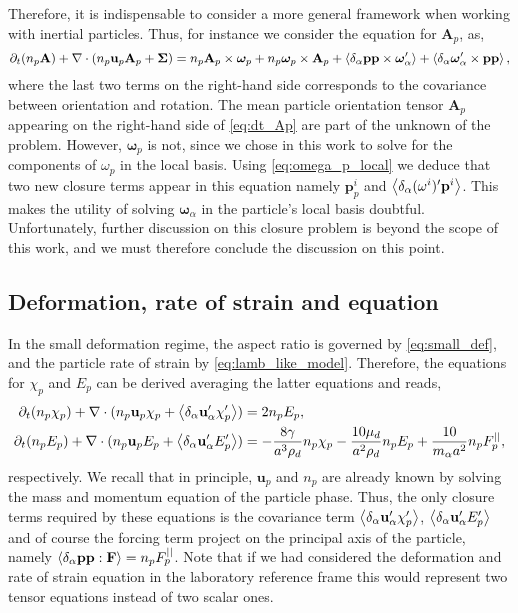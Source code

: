 Therefore, it is indispensable to consider a more general framework when working with inertial particles. 
Thus, for instance we consider the equation for $\textbf{A}_p$, as, 
\begin{equation*}
    \partial_t (n_p\textbf{A})
    + \mathbf{\nabla}\cdot (
        n_p\textbf{u}_p\textbf{A}_p
        + \mathbf{\Sigma}
        )
    =
    n_p \textbf{A}_p \times \bm\omega_p
    + n_p \bm\omega_p \times \textbf{A}_p
    + \left<\delta_\alpha \textbf{pp} \times \bm\omega_\alpha'\right>
    + \left<\delta_\alpha \bm\omega_\alpha' \times \textbf{pp}\right>,
    \label{eq:dt_Ap}
\end{equation*}
where the last two terms on the right-hand side corresponds to the covariance between orientation and rotation. 
The mean particle orientation tensor $\textbf{A}_p$ appearing on the right-hand side of \ref{eq:dt_Ap} are part of the unknown of the problem.
However, $\bm\omega_p$ is not, since we chose in this work to solve for the components of $\omega_p$ in the local basis. 
Using \ref{eq:omega_p_local} we deduce that two new closure terms appear in this equation namely $\textbf{p}_p^i$ and $\left<\delta_\alpha (\omega^i)' \textbf{p}^i\right>$. 
This makes the utility of solving $\bm\omega_\alpha$ in the particle's local basis doubtful. 
Unfortunately, further discussion on this closure problem is beyond the scope of this work, and we must therefore conclude the discussion on this point.

\subsection{Deformation, rate of strain and  equation}

In the small deformation regime, the aspect ratio is governed by \ref{eq:small_def}, and the particle rate of strain by  \ref{eq:lamb_like_model}. 
Therefore, the equations for $\chi_p$ and $E_p$ can be derived averaging the latter equations and reads,  
\begin{align}
    \partial_t (n_p \chi_p)
    + \mathbf{\nabla}\cdot (
        n_p \textbf{u}_p \chi_p 
        + \left<\delta_\alpha \textbf{u}_\alpha' \chi_p'\right>
    )
    &= 2 n_p E_p,
    \label{eq:avg_chi_I}
    \\
    \partial_t (n_p E_p)
    + \mathbf{\nabla}\cdot (
        n_p \textbf{u}_p E_p 
        + \left<\delta_\alpha \textbf{u}_\alpha' E_p'\right>
    )
    &= 
    - \frac{8 \gamma }{a^3\rho_d} n_p \chi_p
    - \frac{10 \mu_d}{a^2\rho_d} n_p E_p
    + \frac{10}{m_\alpha a^2} n_p F^{||}_p,
    \label{eq:avg_E_I}
\end{align}
respectively.
We recall that in principle, $\textbf{u}_p$ and $n_p$ are already known by solving the mass and momentum equation of the particle phase.
Thus, the only closure terms required by these equations is the covariance term $\left<\delta_\alpha \textbf{u}_\alpha' \chi_p'\right>$, $ \left<\delta_\alpha \textbf{u}_\alpha' E_p'\right>$ and of course the forcing term project on the principal axis of the particle, namely $\left<\delta_\alpha \textbf{pp} : \textbf{F}\right> = n_p F_p^{||}$. 
Note that if we had considered the deformation and rate of strain equation in the laboratory reference frame this would represent two tensor equations instead of two scalar ones. 



